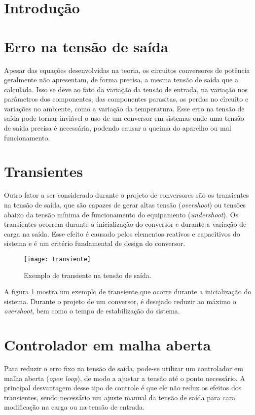\newpage
\section{Introdução}

\section{Erro na tensão de saída}
Apesar das equações desenvolvidas na teoria, os circuitos conversores de potência geralmente não apresentam, de forma precisa, a mesma tensão de saída que a calculada. Isso se deve ao fato da variação da tensão de entrada, na variação nos parâmetros dos componentes, das componentes parasitas, as perdas no circuito e variações no ambiente, como a variação da temperatura.
Esse erro na tensão de saída pode tornar inviável o uso de um conversor em sistemas onde uma tensão de saída precisa é necessária, podendo causar a queima do aparelho ou mal funcionamento.

\section{Transientes}
Outro fator a ser considerado durante o projeto de conversores são os transientes na tensão de saída, que são capazes de gerar altas tensão (\textit{overshoot}) ou tensões abaixo da tensão mínima de funcionamento do equipamento (\textit{undershoot}). Os transientes ocorrem durante a inicialização do conversor e durante a variação de carga na saída. Esse efeito é causado pelos elementos reativos e capacitivos do sistema e é um critério fundamental de design do conversor.

\begin{figure}[H]
    \centering
    \caption{Exemplo de transiente na tensão de saída.}
    \texttt{[image: transiente]}
    \label{fig:transiente}
\end{figure}

A figura \ref{fig:transiente} mostra um exemplo de transiente que ocorre durante a inicialização do sistema. Durante o projeto de um conversor, é desejado reduzir ao máximo o \textit{overshoot}, bem como o tempo de estabilização do sistema.

\section{Controlador em malha aberta}
Para reduzir o erro fixo na tensão de saída, pode-se utilizar um controlador em malha aberta (\textit{open loop}), de modo a ajustar a tensão até o ponto necessário. A principal desvantagem desse tipo de controle é que ele não reduz os efeitos dos transientes, sendo necessário um ajuste manual da tensão de saída para cara modificação na carga ou na tensão de entrada.


